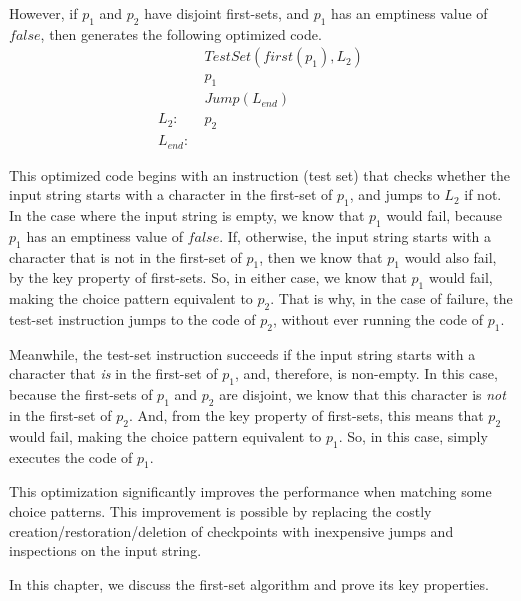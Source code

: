 However,
if $p_1$ and $p_2$ have disjoint first-sets,
and $p_1$ has an emptiness value of $false$,
then \lpeg{} generates the following optimized code.
\begin{align*}
    & TestSet(first(p_1), L_2) \\
    & p_1 \\
    & Jump (L_{end}) \\
    L_2:\ & p_2 \\
    L_{end}:\ &
\end{align*}

This optimized code begins with an instruction (test set)
that checks whether the input string starts with
a character in the first-set of $p_1$,
and jumps to $L_2$ if not.
In the case where the input string is empty,
we know that $p_1$ would fail,
because $p_1$ has an emptiness value of $false$.
If, otherwise, the input string starts with a character
that is not in the first-set of $p_1$,
then we know that $p_1$ would also fail,
by the key property of first-sets.
So, in either case, we know that $p_1$ would fail,
making the choice pattern equivalent to $p_2$.
That is why, in the case of failure,
the test-set instruction jumps to the code of $p_2$,
without ever running the code of $p_1$.

Meanwhile, the test-set instruction succeeds
if the input string starts with a character
that \emph{is} in the first-set of $p_1$,
and, therefore, is non-empty.
In this case, because the first-sets of $p_1$ and $p_2$ are disjoint,
we know that this character is \emph{not} in the first-set of $p_2$.
And, from the key property of first-sets,
this means that $p_2$ would fail,
making the choice pattern equivalent to $p_1$.
So, in this case, \lpeg{} simply executes the code of $p_1$.

This optimization significantly improves
the performance \lpeg{} when matching some choice patterns.
This improvement is possible
by replacing the costly creation/restoration/deletion of checkpoints
with inexpensive jumps and inspections on the input string.

In this chapter, we discuss the first-set algorithm
and prove its key properties.




